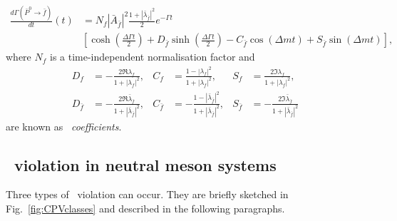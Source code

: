 \begin{equation}
	\label{eq:P0bartofbar}
	\begin{split}
		\frac{d\Gamma(\bar P^0\to \bar f)}{dt}(t) &= N_f |\bar A_{\bar f}|^2 \frac{1+|\bar \lambda_{\bar f}|^2}{2}e^{-\Gamma t} \\
		& \left[ \cosh\left(\frac{\Delta\Gamma t}{2}\right) + D_{\bar f} \sinh\left(\frac{\Delta\Gamma t}{2}\right) - C_{\bar f} \cos \left( \Delta m t \right) + S_{\bar f} \sin \left( \Delta m t \right) \right],
	\end{split}
\end{equation}
where $N_f$ is a time-independent normalisation factor and
\begin{align}
	\label{eq:cp_f}
	D_f &= -\frac{2\Re \lambda_f}{1+|\lambda_f|^2}, & C_f &= \frac{1-|\lambda_f|^2}{1+|\lambda_f|^2}, & S_f &= \frac{2\Im \lambda_f}{1+|\lambda_f|^2}, \\
	\label{eq:cp_fbar}	
	D_{\bar f} &= -\frac{2\Re \bar\lambda_{\bar f}}{1+|\bar\lambda_{\bar f}|^2}, & C_{\bar f} &= -\frac{1-|\bar\lambda_{\bar f}|^2}{1+|\bar\lambda_{\bar f}|^2}, & S_{\bar f} &= -\frac{2\Im \bar\lambda_{\bar f}}{1+|\bar\lambda_{\bar f}|^2}
\end{align}
are known as \emph{\CP~coefficients}.

\subsection[$CP$~violation in neutral meson systems]{~violation in neutral meson systems}
\label{sec:cpv}

Three types of \CP~violation can occur. They are briefly sketched in Fig.~\ref{fig:CPVclasses} and described in the following paragraphs.

